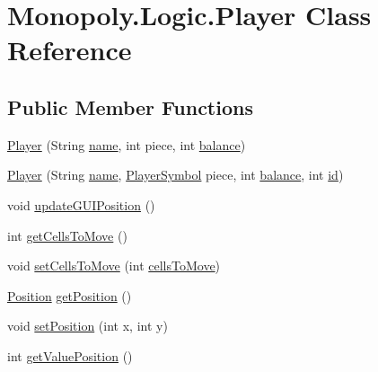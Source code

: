 \hypertarget{class_monopoly_1_1_logic_1_1_player}{}\section{Monopoly.\+Logic.\+Player Class Reference}
\label{class_monopoly_1_1_logic_1_1_player}
\subsection*{Public Member Functions}
\begin{DoxyCompactItemize}
\item 
\hyperlink{class_monopoly_1_1_logic_1_1_player_ae03fd34bc6503a939b2b85f763e0ae7e}{Player} (String \hyperlink{class_monopoly_1_1_logic_1_1_player_ac9a1abcd87e522434ec657f541c69647}{name}, int piece, int \hyperlink{class_monopoly_1_1_logic_1_1_player_adee3b4a4dea242b17568e6d93922a698}{balance})
\item 
\hyperlink{class_monopoly_1_1_logic_1_1_player_a1ddc3d2d7ab423cff3cb395dc456eac0}{Player} (String \hyperlink{class_monopoly_1_1_logic_1_1_player_ac9a1abcd87e522434ec657f541c69647}{name}, \hyperlink{class_monopoly_1_1_logic_1_1_player_symbol}{Player\+Symbol} piece, int \hyperlink{class_monopoly_1_1_logic_1_1_player_adee3b4a4dea242b17568e6d93922a698}{balance}, int \hyperlink{class_monopoly_1_1_logic_1_1_player_a30de4a228019d4020511fb2f573901dd}{id})
\item 
void \hyperlink{class_monopoly_1_1_logic_1_1_player_a1bb5cf33a38b1fe7984d23b632ce48fc}{update\+G\+U\+I\+Position} ()
\item 
int \hyperlink{class_monopoly_1_1_logic_1_1_player_ac0dd44eebc83dba1281e36c359a646ed}{get\+Cells\+To\+Move} ()
\item 
void \hyperlink{class_monopoly_1_1_logic_1_1_player_ad3b5177a7efbe8e2e6854d9c9c8e2c2c}{set\+Cells\+To\+Move} (int \hyperlink{class_monopoly_1_1_logic_1_1_player_a9b17ab340918d686bcca176f7d4da366}{cells\+To\+Move})
\item 
\hyperlink{class_monopoly_1_1_logic_1_1_position}{Position} \hyperlink{class_monopoly_1_1_logic_1_1_player_ae8cbf81d19475e0d7bf009adfffa2bf8}{get\+Position} ()
\item 
void \hyperlink{class_monopoly_1_1_logic_1_1_player_a55cc4fd74bb775780681e5f9bd4e00cf}{set\+Position} (int x, int y)
\item 
int \hyperlink{class_monopoly_1_1_logic_1_1_player_a6b71c11eab1a2335131e0d359aa56fbe}{get\+Value\+Position} ()
\item 

\end{DoxyCompactItemize}
